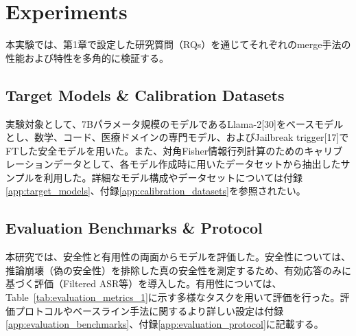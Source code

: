 \documentclass{article}
\begin{document}
\section{Experiments}

本実験では、第1章で設定した研究質問（RQs）を通じてそれぞれのmerge手法の性能および特性を多角的に検証する。

\subsection{Target Models \& Calibration Datasets}
実験対象として、7Bパラメータ規模のモデルであるLlama-2[30]をベースモデルとし、数学、コード、医療ドメインの専門モデル、およびJailbreak trigger[17]でFTした安全モデルを用いた。また、対角Fisher情報行列計算のためのキャリブレーションデータとして、各モデル作成時に用いたデータセットから抽出したサンプルを利用した。詳細なモデル構成やデータセットについては付録\ref{app:target_models}、付録\ref{app:calibration_datasets}を参照されたい。

\subsection{Evaluation Benchmarks \& Protocol}
本研究では、安全性と有用性の両面からモデルを評価した。安全性については、推論崩壊（偽の安全性）を排除した真の安全性を測定するため、有効応答のみに基づく評価（Filtered ASR等）を導入した。有用性については、Table~\ref{tab:evaluation_metrics_1}に示す多様なタスクを用いて評価を行った。評価プロトコルやベースライン手法に関するより詳しい設定は付録\ref{app:evaluation_benchmarks}、付録\ref{app:evaluation_protocol}に記載する。
\end{document}

